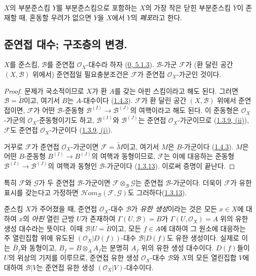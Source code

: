 $X$의 부분준스킴 $Y$를 부분준스킴으로 포함하는 $X$의 가장 작은 닫힌
부분준스킴 $\overline{Y}$이 존재할 때, 혼동할 우려가 없으면
$\overline{Y}$을 $X$에서 $Y$의 \emph{폐포}라고 한다.

\subsection{준연접 대수; 구조층의 변경.}
\label{subsection:I.9.6-ko}

\begin{proposition}[9.6.1]
\label{I.9.6.1-ko}
$X$를 준스킴, $\mathscr{B}$를 준연접 $\mathscr{O}_X$-대수라 하자
(\hyperref[0.5.1.3-ko]{0, 5.1.3}). $\mathscr{B}$-가군 $\mathscr{F}$가
(환 달린 공간 $(X,\mathscr{B})$ 위에서) 준연접일 필요충분조건은
$\mathscr{F}$가 준연접 $\mathscr{O}_X$-가군인 것이다.
\end{proposition}

\begin{proof}
문제가 국소적이므로 $X$가 환 $A$를 갖는 아핀 스킴이라고 해도 된다.
그러면 $\mathscr{B}=\widetilde{B}$이고, 여기서 $B$는 $A$-대수이다
(\hyperref[I.1.4.3-ko]{1.4.3}). $\mathscr{F}$가 환 달린 공간
$(X,\mathscr{B})$ 위에서 준연접이면, $\mathscr{F}$가 어떤
$\mathscr{B}$-준동형 $\mathscr{B}^{(I)}\to\mathscr{B}^{(J)}$의
여핵이라고 해도 된다. 이 준동형은 $\mathscr{O}_X$-가군의
$\mathscr{O}_X$-준동형이기도 하고, $\mathscr{B}^{(I)}$와
$\mathscr{B}^{(J)}$는 준연접 $\mathscr{O}_X$-가군이므로
(\hyperref[I.1.3.9-ko]{1.3.9, (ii)}), $\mathscr{F}$도 준연접
$\mathscr{O}_X$-가군이다
(\hyperref[I.1.3.9-ko]{1.3.9, (i)}).

거꾸로 $\mathscr{F}$가 준연접 $\mathscr{O}_X$-가군이면
$\mathscr{F}=\widetilde{M}$이고, 여기서 $M$은 $B$-가군이다
(\hyperref[I.1.4.3-ko]{1.4.3}). $M$은 어떤 $B$-준동형
$B^{(I)}\to B^{(J)}$의 여핵과 동형이므로, $\mathscr{F}$는 이에
대응하는 준동형 $\mathscr{B}^{(I)}\to\mathscr{B}^{(J)}$의 여핵과
동형인 $\mathscr{B}$-가군이다
(\hyperref[I.1.3.13-ko]{1.3.13}). 이로써 증명이 끝난다.
\end{proof}

특히 $\mathscr{F}$와 $\mathscr{G}$가 두 준연접
$\mathscr{B}$-가군이면 $\mathscr{F}\otimes_{\mathscr{B}}\mathscr{G}$는
준연접 $\mathscr{B}$-가군이다. 더욱이 $\mathscr{F}$가 유한 표시를
갖는다고 가정하면 $\mathscr{H}\!om_{\mathscr{B}}(\mathscr{F},\mathscr{G})$도
그러하다(\hyperref[I.1.3.13-ko]{1.3.13}).

\begin{env}[9.6.2]
\label{I.9.6.2-ko}
준스킴 $X$가 주어졌을 때, 준연접 $\mathscr{O}_X$-대수
$\mathscr{B}$가 \emph{유한 생성}이라는 것은 모든 $x\in X$에 대하여
$x$의 \emph{아핀} 열린 근방 $U$가 존재하여
$\Gamma(U,\mathscr{B})=B$가 $\Gamma(U,\mathscr{O}_X)=A$ 위의 유한 생성
대수라는 뜻이다. 이때 $\mathscr{B}|U=\widetilde{B}$이고, 모든 $f\in A$에
대하여 그 원소에 대응하는 주 열린집합 위에 유도된
$(\mathscr{O}_X|D(f))$-대수
$\mathscr{B}|D(f)$도 유한 생성이다. 실제로 이는
$\widetilde{B_f}$와 동형이고, $B_f=B\otimes_A A_f$는 분명히 $A_f$ 위의
유한 생성 대수이다. $D(f)$들이 $U$의 위상의 기저를 이루므로, 준연접
유한 생성 $\mathscr{O}_X$-대수 $\mathscr{B}$와 $X$의 모든 열린집합
$V$에 대하여 $\mathscr{B}|V$는 준연접 유한 생성
$(\mathscr{O}_X|V)$-대수이다.
\end{env}

